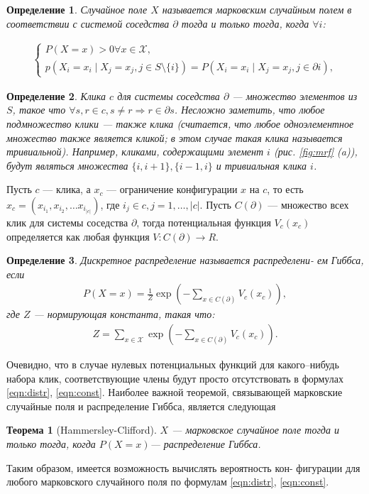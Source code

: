 \documentclass[12pt]{article}
\newtheorem{theorem}{Теорема}
\newtheorem{dfn}{Определение}
\begin{document}
\begin{dfn}
Случайное поле $X$ называется марковским случайным полем в соответствии с системой соседства $\partial$ тогда
и только тогда, когда $\forall i$:

\begin{gather*}
\begin{cases}
P(X = x) > 0 \forall x \in \mathcal{X}, \\
p(X_i = x_i \mid X_j = x_j, j \in S \setminus \{i\}) = P(X_i = x_i \mid X_j = x_j, j \in \partial i),
\end{cases}
\end{gather*}
\end{dfn}

\begin{dfn}
Клика $c$ для системы соседства $\partial$ --- множество элементов из $S$,  такое что $\forall s, r \in c, s \ne r \Rightarrow r \in \partial s$. Несложно заметить,
что любое подмножество клики --- также клика (считается, что любое одноэлементное множество также является кликой; в этом случае такая клика называется тривиальной). Например, кликами, содержащими элемент $i$ (рис. \ref{fig:mrf} (a)), будут являться множества $\{i, i+1 \}, \{i-1, i\}$ и тривиальная клика $i$.
\end{dfn}

Пусть $c$ --- клика, а $x_c$ --- ограничение конфигурации $x$ на $c$, то есть $x_c = (x_{i_1}, x_{i_2}, \ldots x_{i_{|c|}})$, где $i_j \in c, j = 1, \ldots, |c|$. Пусть $C(\partial)$ --- множество всех клик для системы соседства $\partial$, тогда потенциальная функция $V_c(x_c)$ определяется как любая функция $V : C(\partial) \rightarrow R$.

\begin{dfn}
Дискретное распределение называется распределени-
ем Гиббса, если
\begin{gather}
P(X=x) = \frac1Z \exp \left( - \sum\limits_{x\in C(\partial)} V_c(x_c) \right), 
\label{eqn:distr}
\end{gather}
где $Z$ --- нормирующая константа, такая что:
\begin{gather}
Z = \sum\limits_{x\in \mathcal{X}} \exp \left( - \sum\limits_{x\in C(\partial)} V_c(x_c)  \right).
\label{eqn:const}
\end{gather}
\end{dfn}
Очевидно, что в случае нулевых потенциальных функций для какого--нибудь набора клик, соответствующие члены будут просто отсутствовать в формулах \eqref{eqn:distr}, \eqref{eqn:const}.
Наиболее важной теоремой, связывающей марковские случайные
поля и распределение Гиббса, является следующая
\begin{theorem}[Hammersley-Clifford]
$X$ --- марковское случайное поле тогда и только тогда, когда $P(X = x)$--- распределение Гиббса.
\end{theorem}
Таким образом, имеется возможность вычислять вероятность кон-
фигурации для любого марковского случайного поля по формулам \eqref{eqn:distr}, \eqref{eqn:const}.
\end{document}
